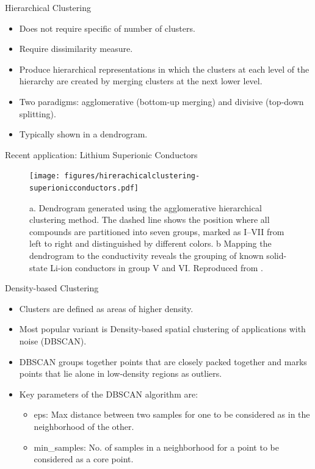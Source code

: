 \documentclass[aspectratio=169]{beamer}
\begin{document}
\begin{frame}{Hierarchical Clustering}
    \begin{itemize}
        \item Does not require specific of number of clusters.
        \item Require dissimilarity measure.
        \item Produce hierarchical representations in which the clusters at each level of the hierarchy are created by merging clusters at the next lower level. 
        \item Two paradigms: agglomerative (bottom-up merging) and divisive (top-down splitting).
        \item Typically shown in a dendrogram.
    \end{itemize}
\end{frame}


\begin{frame}{Recent application: Lithium Superionic Conductors}
\begin{figure}
    \centering
    \texttt{[image: figures/hirerachicalclustering-superionicconductors.pdf]}
    \caption{a. Dendrogram generated using the agglomerative hierarchical clustering method. The dashed line shows the position where all compounds are partitioned into seven groups, marked as I–VII from left to right and distinguished by different colors. b Mapping the dendrogram to the conductivity reveals the grouping of known solid-state Li-ion conductors in group V and VI. Reproduced from \cite{zhangUnsupervisedDiscoverySolidstate2019}.}
\end{figure}
\end{frame}


\begin{frame}{Density-based Clustering}
    \begin{itemize}
        \item Clusters are defined as areas of higher density.
        \item Most popular variant is Density-based spatial clustering of applications with noise (DBSCAN).\cite{esterDensityBasedAlgorithmDiscovering}
        \item DBSCAN groups together points that are closely packed together and marks points that lie alone in low-density regions as outliers. 
        \item Key parameters of the DBSCAN algorithm are:
        \begin{itemize}
            \item eps: Max distance between two samples for one to be considered as in the neighborhood of the other. 
            \item min\_samples: No. of samples in a neighborhood for a point to be considered as a core point.
        \end{itemize}
    \end{itemize}
\end{frame}
\end{document}
